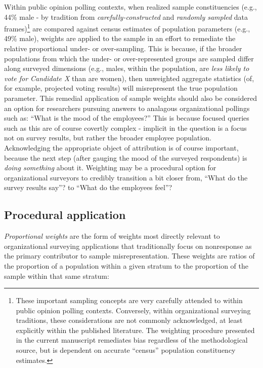 \documentclass[
  man,mask]{apa7}
\begin{document}
Within public opinion polling contexts, when realized sample constituencies (e.g., 44\% male - by tradition from \emph{carefully-constructed} and \emph{randomly sampled} data frames)\footnote{These important sampling concepts are very carefully attended to within public opinion polling contexts. Conversely, within organizational surveying traditions, these considerations are not commonly acknowledged, at least explicitly within the published literature. The weighting procedure presented in the current manuscript remediates bias regardless of the methodological source, but is dependent on accurate ``census'' population constituency estimates.} are compared against census estimates of population parameters (e.g., 49\% male), weights are applied to the sample in an effort to remediate the relative proportional under- or over-sampling. This is because, if the broader populations from which the under- or over-represented groups are sampled differ along surveyed dimensions (e.g., males, within the population, are \emph{less likely to vote for Candidate X} than are women), then unweighted aggregate statistics (of, for example, projected voting results) will misrepresent the true population parameter. This remedial application of sample weights should also be considered an option for researchers pursuing answers to analagous organizational pollings such as: ``What is the mood of the employees?'' This is because focused queries such as this are of course covertly complex - implicit in the question is a focus not on survey results, but rather the broader employee population. Acknowledging the appropriate object of attribution is of course important, because the next step (after gauging the mood of the surveyed respondents) is \emph{doing something} about it. Weighting may be a procedural option for organizational surveyors to credibly transition a bit closer from, ``What do the survey results say''? to ``What do the employees feel''?

\subsection{Procedural application}\label{procedural-application}

\emph{Proportional weights} are the form of weights most directly relevant to organizational surveying applications that traditionally focus on nonresponse as the primary contributor to sample misrepresentation. These weights are ratios of the proportion of a population within a given stratum to the proportion of the sample within that same stratum:
\end{document}
